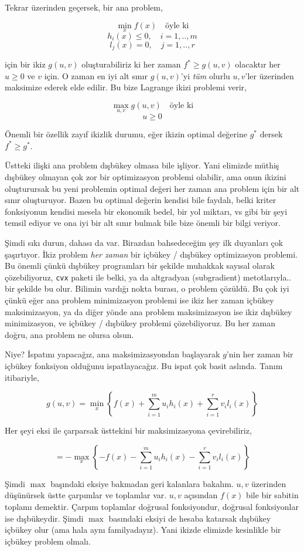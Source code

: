 \documentclass[12pt,fleqn]{article}\usepackage{../../common}
\begin{document}
Tekrar üzerinden geçersek, bir ana problem,

$$
\min_x f(x) \quad \textrm{öyle ki}
$$
$$
h_i(x) \le 0, \quad i=1,..,m
$$
$$
l_j(x) = 0, \quad j=1,..,r
$$

için bir ikiz $g(u,v)$ oluşturabiliriz ki her zaman $f^* \ge g(u,v)$
olacaktır her $u \ge 0$ ve $v$ için. O zaman en iyi alt sınır $g(u,v)$'yi
{\em tüm} olurlu $u,v$'ler üzerinden maksimize ederek elde edilir. Bu bize
Lagrange ikizi problemi verir,

$$
\max_{u,v} g(u,v) \quad \textrm{öyle ki}
$$
$$
u \ge 0
$$

Önemli bir özellik zayıf ikizlik durumu, eğer ikizin optimal değerine $g^*$
dersek $f^* \ge g^*$.

Üstteki ilişki ana problem dışbükey olmasa bile işliyor. Yani elimizde
müthiş dışbükey olmayan çok zor bir optimizasyon problemi olabilir, ama
onun ikizini oluşturursak bu yeni problemin optimal değeri her zaman ana
problem için bir alt sınır oluşturuyor. Bazen bu optimal değerin kendisi
bile faydalı, belki kriter fonksiyonun kendisi mesela bir ekonomik bedel,
bir yol miktarı, vs gibi bir şeyi temsil ediyor ve ona iyi bir alt sınır
bulmak bile bize önemli bir bilgi veriyor.

Şimdi sıkı durun, dahası da var. Birazdan bahsedeceğim şey ilk duyanları
çok şaşırtıyor. İkiz problem {\em her zaman} bir içbükey / dışbükey
optimizasyon problemi. Bu önemli çünkü dışbükey programları bir şekilde
muhakkak sayısal olarak çözebiliyoruz, \verb!cvx! paketi ile belki, ya da
altgradyan (subgradient) metotlarıyla.. bir şekilde bu olur. Bilimin
vardığı nokta burası, o problem çözüldü. Bu çok iyi çünkü eğer ana problem
minimizasyon problemi ise ikiz her zaman içbükey maksimizasyon, ya da diğer
yönde ana problem maksimizasyon ise ikiz dışbükey minimizasyon, ve içbükey
/ dışbükey problemi çözebiliyoruz. Bu her zaman doğru, ana problem ne
olursa olsun.

Niye? İspatını yapacağız, ana maksimizasyondan başlayarak $g$'nin her zaman
bir içbükey fonksiyon olduğunu ispatlayacağız. Bu ispat çok basit
aslında. Tanım itibariyle,

$$
g(u,v) = \min_x \left\{ 
f(x) + \sum _{i=1}^{m} u_i h_i(x) + \sum _{i=1}^{r} v_i l_i(x) 
\right\}
$$

Her şeyi eksi ile çarparsak üsttekini bir maksimizasyona çevirebiliriz,

$$
= -\max_x \left\{ 
-f(x) - \sum_{i=1}^{m} u_i h_i(x) - \sum_{i=1}^{r} v_i l_i(x) 
\right\}
$$

Şimdi $\max$ başındaki eksiye bakmadan geri kalanlara bakalım. $u,v$
üzerinden düşünürsek üstte çarpımlar ve toplamlar var. $u,v$ açısından
$f(x)$ bile bir sabitin toplamı demektir. Çarpım toplamlar doğrusal
fonksiyondur, doğrusal fonksiyonlar ise dışbükeydir. Şimdi $\max$ basındaki
eksiyi de hesaba katarsak dışbükey içbükey olur (ama hala aynı
familyadayız). Yani ikizde elimizde kesinlikle bir içbükey problem olmalı.
\end{document}
